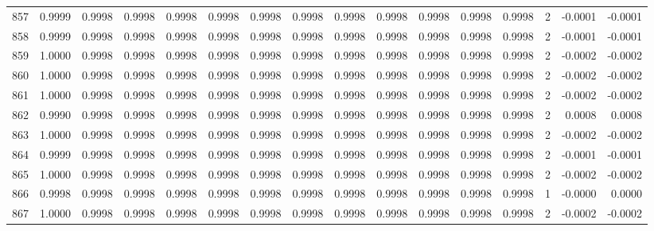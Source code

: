 \begin{tabular}{lrrrrrrrrrrrrrrr}
857 &      0.9999 &  0.9998 &  0.9998 &  0.9998 &  0.9998 &  0.9998 &  0.9998 &  0.9998 &  0.9998 &  0.9998 &   0.9998 &     0.9998 &      2 &                   -0.0001 &                    -0.0001 \\
858 &      0.9999 &  0.9998 &  0.9998 &  0.9998 &  0.9998 &  0.9998 &  0.9998 &  0.9998 &  0.9998 &  0.9998 &   0.9998 &     0.9998 &      2 &                   -0.0001 &                    -0.0001 \\
859 &      1.0000 &  0.9998 &  0.9998 &  0.9998 &  0.9998 &  0.9998 &  0.9998 &  0.9998 &  0.9998 &  0.9998 &   0.9998 &     0.9998 &      2 &                   -0.0002 &                    -0.0002 \\
860 &      1.0000 &  0.9998 &  0.9998 &  0.9998 &  0.9998 &  0.9998 &  0.9998 &  0.9998 &  0.9998 &  0.9998 &   0.9998 &     0.9998 &      2 &                   -0.0002 &                    -0.0002 \\
861 &      1.0000 &  0.9998 &  0.9998 &  0.9998 &  0.9998 &  0.9998 &  0.9998 &  0.9998 &  0.9998 &  0.9998 &   0.9998 &     0.9998 &      2 &                   -0.0002 &                    -0.0002 \\
862 &      0.9990 &  0.9998 &  0.9998 &  0.9998 &  0.9998 &  0.9998 &  0.9998 &  0.9998 &  0.9998 &  0.9998 &   0.9998 &     0.9998 &      2 &                    0.0008 &                     0.0008 \\
863 &      1.0000 &  0.9998 &  0.9998 &  0.9998 &  0.9998 &  0.9998 &  0.9998 &  0.9998 &  0.9998 &  0.9998 &   0.9998 &     0.9998 &      2 &                   -0.0002 &                    -0.0002 \\
864 &      0.9999 &  0.9998 &  0.9998 &  0.9998 &  0.9998 &  0.9998 &  0.9998 &  0.9998 &  0.9998 &  0.9998 &   0.9998 &     0.9998 &      2 &                   -0.0001 &                    -0.0001 \\
865 &      1.0000 &  0.9998 &  0.9998 &  0.9998 &  0.9998 &  0.9998 &  0.9998 &  0.9998 &  0.9998 &  0.9998 &   0.9998 &     0.9998 &      2 &                   -0.0002 &                    -0.0002 \\
866 &      0.9998 &  0.9998 &  0.9998 &  0.9998 &  0.9998 &  0.9998 &  0.9998 &  0.9998 &  0.9998 &  0.9998 &   0.9998 &     0.9998 &      1 &                   -0.0000 &                     0.0000 \\
867 &      1.0000 &  0.9998 &  0.9998 &  0.9998 &  0.9998 &  0.9998 &  0.9998 &  0.9998 &  0.9998 &  0.9998 &   0.9998 &     0.9998 &      2 &                   -0.0002 &                    -0.0002 \\

\end{tabular}
